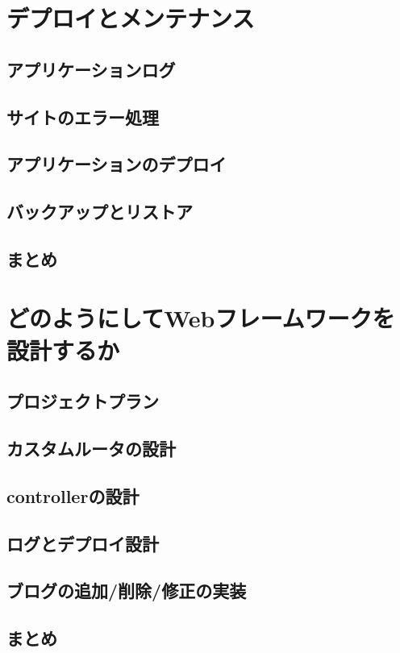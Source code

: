 \section{デプロイとメンテナンス}

\subsection{アプリケーションログ}

\subsection{サイトのエラー処理}

\subsection{アプリケーションのデプロイ}

\subsection{バックアップとリストア}

\subsection{まとめ}


\section{どのようにしてWebフレームワークを設計するか}

\subsection{プロジェクトプラン}

\subsection{カスタムルータの設計}

\subsection{controllerの設計}

\subsection{ログとデプロイ設計}

\subsection{ブログの追加/削除/修正の実装}

\subsection{まとめ}


